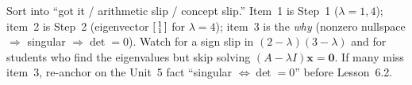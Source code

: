 \documentclass[10pt]{article}
\newcommand{\xx}{\mathbf{x}}
\newcommand{\zero}{\mathbf{0}}
\begin{document}
\begin{teachernote}
Sort into ``got it / arithmetic slip / concept slip.'' Item~1 is Step~1 ($\lambda=1,4$); item~2 is
Step~2 (eigenvector $\begin{bsmallmatrix}1\\1\end{bsmallmatrix}$ for $\lambda=4$); item~3 is the
\emph{why} (nonzero nullspace $\Rightarrow$ singular $\Rightarrow\det=0$). Watch for a sign slip in
$(2-\lambda)(3-\lambda)$ and for students who find the eigenvalues but skip solving
$(A-\lambda I)\xx=\zero$. If many miss item~3, re-anchor on the Unit~5 fact ``singular
$\Leftrightarrow\det=0$'' before Lesson~6.2.
\end{teachernote}
\end{document}

